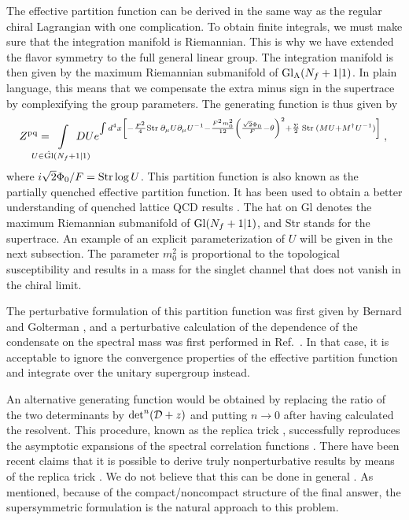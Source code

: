 The effective partition function can be derived in the same way as the
regular chiral Lagrangian with one complication. To obtain finite
integrals, we must make sure that the integration manifold is
Riemannian. This is why we have extended the flavor
symmetry to the full general linear group.  The integration manifold
is then given by the maximum Riemannian submanifold of ${\rm
  Gl}_{\rm A}(N_f+1|1)$. In plain language, this means that we compensate the
extra minus sign in the supertrace by complexifying the group
parameters.  The generating function is thus given by \cite{OTV}
\begin{equation}
  \label{zspect}
  Z^{\rm pq}=\hspace*{-17pt}\int\limits_{U\in {\hat {\rm Gl}}(N_f+1|1)} 
  \hspace*{-17pt} DU e^{\int d^4x \left[-\frac
      {F^2}4 \Str \partial_\mu U \partial_\mu U^{-1} -
      \frac{F^2m_0^2}{12}\left(\frac{\sqrt 2 \Phi_0}F  
        - \theta \right )^2 + \frac{ \Sigma}2\:
      \Str (MU + M^\dagger U^{-1})\right]}\:, \nonumber \\
\end{equation}
where $i\sqrt 2\Phi_0/F = {\rm Str} \log U $.  This partition function
is also known as the partially quenched effective partition function.
It has been used to obtain a better understanding of quenched lattice
QCD results \cite{Maarten,Sharpe}.  The hat on Gl denotes the maximum
Riemannian submanifold of ${\rm Gl}(N_f+1|1)$, and Str stands for the
supertrace.  An example of an explicit parameterization of $U$ will
be given in the next subsection.  The parameter $m_0^2$ is
proportional to the topological susceptibility and results in a mass
for the singlet channel that does not vanish in the chiral limit.

The perturbative formulation of this partition function was first
given by Bernard and Golterman \cite{Maarten}, and a perturbative
calculation of the dependence of the condensate on the spectral mass
was first performed in Ref.~\cite{Leung}. In that case, it is
acceptable to ignore
the convergence properties of the effective partition function and
integrate over the unitary supergroup instead.

An alternative generating function would be obtained by replacing the
ratio of 
the two determinants by ${\det}^n({\cal D}+z)$ and putting $n
\rightarrow 0$ after having calculated the resolvent.  This procedure,
known as the replica trick \cite{edwards}, successfully
reproduces the asymptotic expansions of the spectral correlation
functions \cite{asympt,pourep}.  There have been recent claims that it
is possible to derive truly nonperturbative results by means of the
replica trick \cite{kamenev,yurk,kanrep}.  We do not believe that this
can be done in general \cite{critique,zirnrep,dalmazi}.  As mentioned,
because of the compact/noncompact structure of the final answer, the
supersymmetric formulation is the natural approach to this problem.

